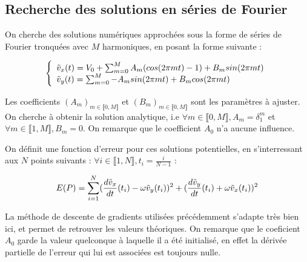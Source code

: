 \documentclass{article}
\begin{document}
\subsection{Recherche des solutions en séries de Fourier}
On cherche des solutions numériques approchées sous la forme de séries de Fourier tronquées avec $M$ harmoniques, en posant la forme suivante :

\begin{equation}
\left\{
    \begin{array}{ll}
        \Tilde{v}_x(t) = V_0 + \sum_{m=0}^{M} A_m (cos(2\pi m t)-1) + B_m sin(2\pi m t) \\
        \Tilde{v}_y(t) = \sum_{m=0}^{M} -A_m sin(2\pi m t) + B_m cos(2\pi m t)
    \end{array}
\right.
\label{eq:solution Fourier couplée}
\end{equation}

Les coefficients $(A_m)_{m\in \llbracket 0,M \rrbracket}$ et $(B_m)_{m\in \llbracket 0,M \rrbracket}$ sont les paramètres à ajuster.
On cherche à obtenir la solution analytique, i.e $\forall m \in\llbracket 0,M \rrbracket, A_m = \delta _1 ^m $ et $\forall m \in\llbracket 1,M \rrbracket, B_m = 0 $. On remarque que le coefficient $A_0$ n'a aucune influence.

On définit une fonction d'erreur pour ces solutions potentielles, en s'interressant aux $N$ points suivants : $\forall i \in\llbracket 1,N \rrbracket, t_i = \frac{i}{N-1} $ :

\begin{equation}
        E(P) = \sum_{i=1}^{N} (\frac{d\Tilde{v}_x}{dt}(t_i) - \omega \Tilde{v}_y(t_i))^2 + (\frac{d\Tilde{v}_y}{dt}(t_i) + \omega \Tilde{v}_x(t_i))^2
\label{eq:erreur descente gradient couplées}
\end{equation}

La méthode de descente de gradients utilisées précédemment s'adapte très bien ici, et permet de retrouver les valeurs théoriques. On remarque que le coeficient $A_0$ garde la valeur quelconque à laquelle il a été initialisé, en effet la dérivée partielle de l'erreur qui lui est associées est toujours nulle.
\end{document}
